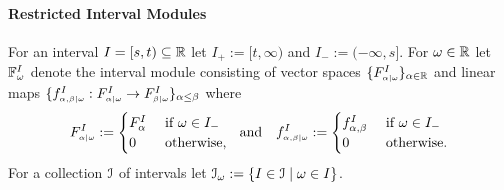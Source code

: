 %

\paragraph{Restricted Interval Modules}

For an interval $I = [s,t)\subseteq \mathbb{R}$ let $I_+ := [t,\infty)$ and $I_- := (-\infty, s]$.
For $\omega\in\mathbb{R}$ let $\mathbb{F}_{\omega}^I$ denote the interval module consisting of vector spaces $\{F_{\scriptscriptstyle \alpha\mid \omega}^I\}_{\alpha\in\mathbb{R}}$ and linear maps $\{f_{\scriptscriptstyle \alpha,\beta\mid \omega}^I : F_{\scriptscriptstyle \alpha\mid \omega}^I\to F_{\scriptscriptstyle \beta\mid \omega}^I\}_{\alpha\leq\beta}$ where
\[ F_{\scriptscriptstyle \alpha\mid \omega}^I := \begin{cases} F_\alpha^I&\text{ if } \omega\in I_-\\ 0&\text{ otherwise,}\end{cases}\ \text{ and }\ \ f_{\scriptscriptstyle \alpha,\beta\mid \omega}^I := \begin{cases} f_{\alpha,\beta}^I&\text{ if } \omega\in I_-\\ 0&\text{ otherwise.}\end{cases}\]
For a collection $\mathcal{I}$ of intervals let $\mathcal{I}_\omega := \{I\in\mathcal{I}\mid \omega\in I\}$.


